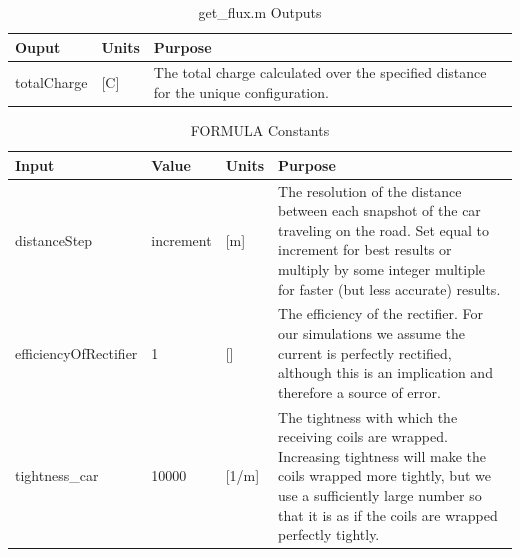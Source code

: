 \begin{table}[H]
    \caption[get\_flux.m Outputs]{get\_flux.m Outputs}
    \begin{center}
    \begin{tabular}{| p{} | p{} | p{} |}
    \hline
    Ouput & Units & Purpose \\
    \hline \hline
    totalCharge & [C] & The total charge calculated over the specified distance for the unique configuration. \\
    \hline
    \end{tabular}
    \end{center}
    \label{t9}
\end{table}

\begin{table}[H]
    \caption[FORMULA Constants]{FORMULA Constants}
    \begin{center}
    \begin{tabular}{| p{} | p{} | p{} | p{} |}
    \hline
    Input & Value & Units & Purpose \\
    \hline \hline
    distanceStep & increment & [m] & The resolution of the distance between each snapshot of the car traveling on the road. Set equal to increment for best results or multiply by some integer multiple for faster (but less accurate) results. \\
    efficiencyOfRectifier & 1 & [] & The efficiency of the rectifier. For our simulations we assume the current is perfectly rectified, although this is an implication and therefore a source of error. \\
    tightness\_car & 10000 & [1/m] & The tightness with which the receiving coils are wrapped. Increasing tightness will make the coils wrapped more tightly, but we use a sufficiently large number so that it is as if the coils are wrapped perfectly tightly. \\
    \hline
    \end{tabular}
    \end{center}
    \label{t10}
\end{table}

